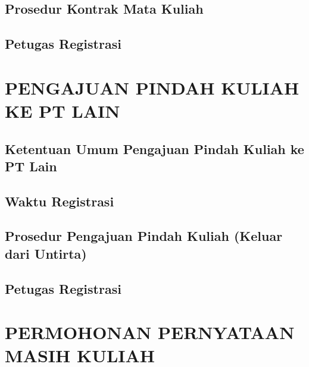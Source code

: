 \documentclass[
]{book}
\begin{document}
\hypertarget{prosedur-kontrak-mata-kuliah-3}{%
\section{Prosedur Kontrak Mata Kuliah}\label{prosedur-kontrak-mata-kuliah-3}}

\hypertarget{petugas-registrasi-4}{%
\section{Petugas Registrasi}\label{petugas-registrasi-4}}

\hypertarget{pengajuan-pindah-kuliah-ke-pt-lain}{%
\chapter{PENGAJUAN PINDAH KULIAH KE PT LAIN}\label{pengajuan-pindah-kuliah-ke-pt-lain}}

\hypertarget{ketentuan-umum-pengajuan-pindah-kuliah-ke-pt-lain}{%
\section{Ketentuan Umum Pengajuan Pindah Kuliah ke PT Lain}\label{ketentuan-umum-pengajuan-pindah-kuliah-ke-pt-lain}}

\hypertarget{waktu-registrasi-5}{%
\section{Waktu Registrasi}\label{waktu-registrasi-5}}

\hypertarget{prosedur-pengajuan-pindah-kuliah-keluar-dari-untirta}{%
\section{Prosedur Pengajuan Pindah Kuliah (Keluar dari Untirta)}\label{prosedur-pengajuan-pindah-kuliah-keluar-dari-untirta}}

\hypertarget{petugas-registrasi-5}{%
\section{Petugas Registrasi}\label{petugas-registrasi-5}}

\hypertarget{permohonan-pernyataan-masih-kuliah}{%
\chapter{PERMOHONAN PERNYATAAN MASIH KULIAH}\label{permohonan-pernyataan-masih-kuliah}}
\end{document}
